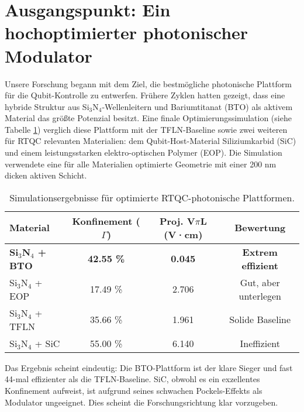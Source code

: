 \documentclass[12pt, a4paper, numbers]{report}
\begin{document}
\section{Ausgangspunkt: Ein hochoptimierter photonischer Modulator}
Unsere Forschung begann mit dem Ziel, die bestmögliche photonische Plattform für die Qubit-Kontrolle zu entwerfen. Frühere Zyklen hatten gezeigt, dass eine hybride Struktur aus Si$_3$N$_4$-Wellenleitern und Bariumtitanat (BTO) als aktivem Material das größte Potenzial besitzt. Eine finale Optimierungssimulation (siehe Tabelle \ref{tab:rtqc}) verglich diese Plattform mit der TFLN-Baseline sowie zwei weiteren für RTQC relevanten Materialien: dem Qubit-Host-Material Siliziumkarbid (SiC) und einem leistungsstarken elektro-optischen Polymer (EOP). Die Simulation verwendete eine für alle Materialien optimierte Geometrie mit einer 200 nm dicken aktiven Schicht.

\begin{table}[htbp]
\caption{Simulationsergebnisse für optimierte RTQC-photonische Plattformen.}
\label{tab:rtqc}
\centering
\begin{tabular}{lccc}
\toprule
\textbf{Material} & \textbf{Konfinement ($\Gamma$)} & \textbf{Proj. V$\pi$L (V·cm)} & \textbf{Bewertung} \\
\midrule
\textbf{Si$_3$N$_4$ + BTO} & \textbf{42.55 \%} & \textbf{0.045} & \textbf{Extrem effizient} \\
Si$_3$N$_4$ + EOP & 17.49 \% & 2.706 & Gut, aber unterlegen \\
Si$_3$N$_4$ + TFLN & 35.66 \% & 1.961 & Solide Baseline \\
Si$_3$N$_4$ + SiC & 55.00 \% & 6.140 & Ineffizient \\
\bottomrule
\end{tabular}
\end{table}

Das Ergebnis scheint eindeutig: Die BTO-Plattform ist der klare Sieger und fast 44-mal effizienter als die TFLN-Baseline. SiC, obwohl es ein exzellentes Konfinement aufweist, ist aufgrund seines schwachen Pockels-Effekts als Modulator ungeeignet. Dies scheint die Forschungsrichtung klar vorzugeben.
\end{document}
